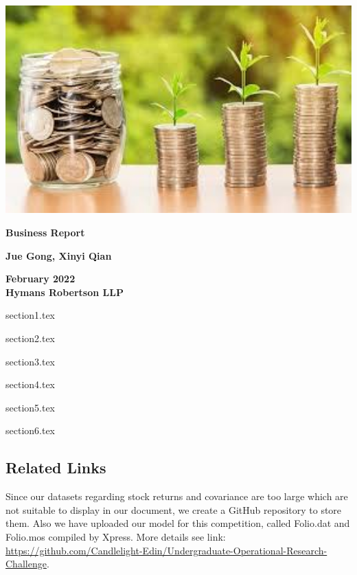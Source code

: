 \documentclass[12pt]{article}
\begin{document}
\begin{titlepage}

\begin{center}
    \includegraphics[width=15cm]{./titlepage.jpeg}
    
    \vspace*{1cm}

    \textbf{\Huge \bfseries Business Report}
            
    \vspace{1.5cm}

    \textbf{\large Jue Gong, Xinyi Qian}

    \vfill
    
    \textbf{February 2022\\
    Hymans Robertson LLP}
\end{center}

\end{titlepage}


\newpage

\tableofcontents
\newpage

{section1.tex}

{section2.tex}

{section3.tex}

{section4.tex}

{section5.tex}

{section6.tex}

\begin{appendices}
\section{Related Links}
Since our datasets regarding stock returns and covariance are too large which are not suitable to display in our document, we create a GitHub repository to store them. Also we have uploaded our model for this competition, called Folio.dat and Folio.mos compiled by Xpress. More details see link: \url{https://github.com/Candlelight-Edin/Undergraduate-Operational-Research-Challenge}.
\end{appendices}
\end{document}
